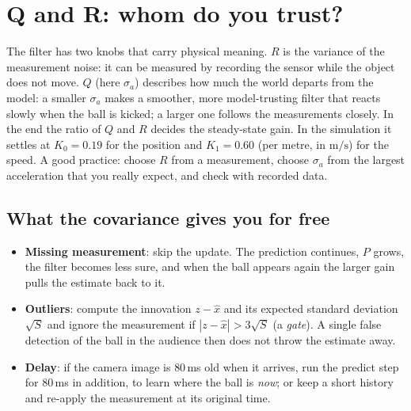 \begin{center}
\end{center}

\section*{Q and R: whom do you trust?}
The filter has two knobs that carry physical meaning. $R$ is the variance of the measurement noise: it can be measured by recording the sensor while the object does not move. $Q$ (here $\sigma_a$) describes how much the world departs from the model: a smaller $\sigma_a$ makes a smoother, more model-trusting filter that reacts slowly when the ball is kicked; a larger one follows the measurements closely. In the end the ratio of $Q$ and $R$ decides the steady-state gain. In the simulation it settles at $K_0=0.19$ for the position and $K_1=0.60$ (per metre, in $\mathrm{m/s}$) for the speed. A good practice: choose $R$ from a measurement, choose $\sigma_a$ from the largest acceleration that you really expect, and check with recorded data.

\subsection*{What the covariance gives you for free}
\begin{itemize}[nosep]
  \item \textbf{Missing measurement}: skip the update. The prediction continues, $P$ grows, the filter becomes less sure, and when the ball appears again the larger gain pulls the estimate back to it.
  \item \textbf{Outliers}: compute the innovation $z-\hat x$ and its expected standard deviation $\sqrt S$ and ignore the measurement if $|z-\hat x|>3\sqrt S$ (a \emph{gate}). A single false detection of the ball in the audience then does not throw the estimate away.
  \item \textbf{Delay}: if the camera image is $80$\,ms old when it arrives, run the predict step for $80$\,ms in addition, to learn where the ball is \emph{now}; or keep a short history and re-apply the measurement at its original time.
\end{itemize}

